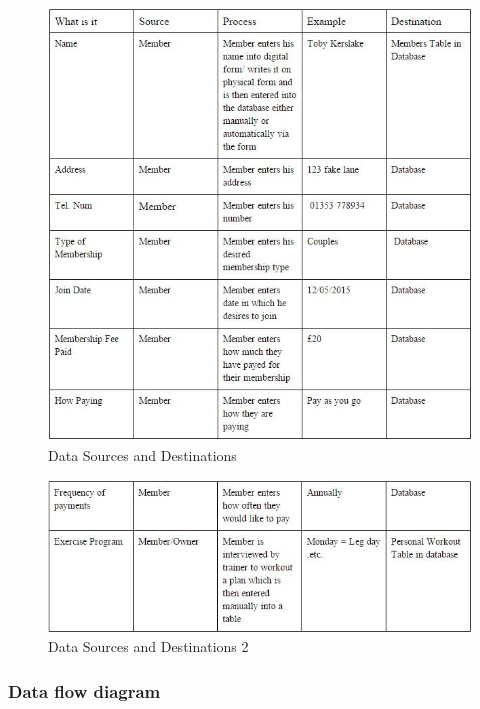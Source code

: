 \begin{figure}[H]
    \includegraphics[width=\textwidth]{ProposedSources.jpg}
    \caption{Data Sources and Destinations} \label{fig: Data Sources and Destinations }
\end{figure}

\begin{figure}[H]
    \includegraphics[width=\textwidth]{ProposedSources2.jpg}
    \caption{Data Sources and Destinations 2} \label{fig: Data Sources and Destinations 2 }
\end{figure}

\subsubsection{Data flow diagram}

